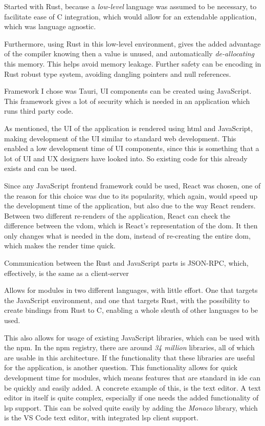 Started with Rust, because a \textit{low-level} language was assumed to be
necessary, to facilitate ease of C integration, which would allow for an
extendable application, which was language agnostic.

Furthermore, using Rust in this low-level environment, gives the added advantage
of the compiler knowing then a value is unused, and automatically
\textit{de-allocating} this memory. This helps avoid memory leakage. Further
safety can be encoding in Rust robust type system, avoiding dangling pointers
and null references.

Framework I chose was Tauri, UI components can be created using JavaScript. This
framework gives a lot of security which is needed in an application which runs
third party code.

As mentioned, the UI of the application is rendered using \gls{html} and
JavaScript, making development of the UI similar to standard web development.
This enabled a low development time of UI components, since this is something
that a lot of UI and UX designers have looked into. So existing code for this
already exists and can be used.

Since any JavaScript frontend framework could be used, React was chosen, one of
the reason for this choice was due to its popularity, which again, would speed
up the development time of the application, but also due to the way React
renders. Between two different re-renders of the application, React can check
the difference between the \gls{vdom}, which is React's representation of the
\gls{dom}. It then only changes what is needed in the \gls{dom}, instead of
re-creating the entire \gls{dom}, which makes the render time quick.

Communication between the Rust and JavaScript parts is JSON-RPC, which,
effectively, is the same as a client-server

Allows for modules in two different languages, with little effort. One that
targets the JavaScript environment, and one that targets Rust, with the
possibility to create bindings from Rust to C, enabling a whole sleuth of other
languages to be used.

This also allows for usage of existing JavaScript libraries, which can be used
with the \gls{npm}. In the \gls{npm} registry, there are around
\textit{34 million} libraries, all of which are usable in this architecture. If
the functionality that these libraries are useful for the application, is
another question. This functionality allows for quick development time for
modules, which means features that are standard in \gls{ide} can be quickly and
easily added. A concrete example of this, is the text editor. A text editor in
itself is quite complex, especially if one needs the added functionality of
\gls{lsp} support. This can be solved quite easily by adding the
\textit{Monaco} library, which is the VS Code text editor, with integrated
\gls{lsp} client support.

